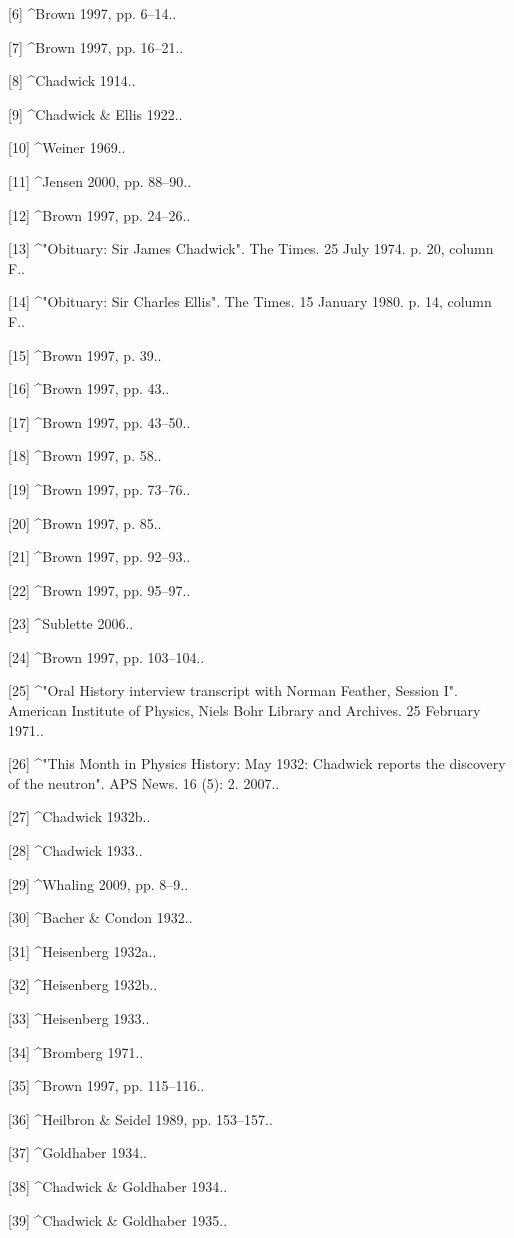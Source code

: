 [6]
^Brown 1997, pp. 6–14..

[7]
^Brown 1997, pp. 16–21..

[8]
^Chadwick 1914..

[9]
^Chadwick & Ellis 1922..

[10]
^Weiner 1969..

[11]
^Jensen 2000, pp. 88–90..

[12]
^Brown 1997, pp. 24–26..

[13]
^"Obituary: Sir James Chadwick". The Times. 25 July 1974. p. 20, column F..

[14]
^"Obituary: Sir Charles Ellis". The Times. 15 January 1980. p. 14, column F..

[15]
^Brown 1997, p. 39..

[16]
^Brown 1997, pp. 43..

[17]
^Brown 1997, pp. 43–50..

[18]
^Brown 1997, p. 58..

[19]
^Brown 1997, pp. 73–76..

[20]
^Brown 1997, p. 85..

[21]
^Brown 1997, pp. 92–93..

[22]
^Brown 1997, pp. 95–97..

[23]
^Sublette 2006..

[24]
^Brown 1997, pp. 103–104..

[25]
^"Oral History interview transcript with Norman Feather, Session I". American Institute of Physics, Niels Bohr Library and Archives. 25 February 1971..

[26]
^"This Month in Physics History: May 1932: Chadwick reports the discovery of the neutron". APS News. 16 (5): 2. 2007..

[27]
^Chadwick 1932b..

[28]
^Chadwick 1933..

[29]
^Whaling 2009, pp. 8–9..

[30]
^Bacher & Condon 1932..

[31]
^Heisenberg 1932a..

[32]
^Heisenberg 1932b..

[33]
^Heisenberg 1933..

[34]
^Bromberg 1971..

[35]
^Brown 1997, pp. 115–116..

[36]
^Heilbron & Seidel 1989, pp. 153–157..

[37]
^Goldhaber 1934..

[38]
^Chadwick & Goldhaber 1934..

[39]
^Chadwick & Goldhaber 1935..

